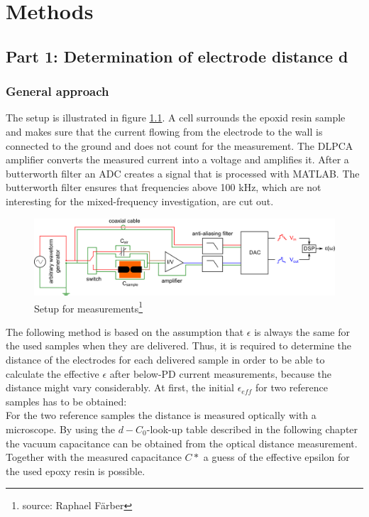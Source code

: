 \chapter{Methods}
\section{Part 1: Determination of electrode distance d}
\label{part1}
\subsection{General approach}
The setup is illustrated in figure \ref{sec.setup_amp_1}. A cell surrounds the  epoxid resin sample and makes sure that the current flowing from the electrode to the wall is connected to the ground and does not count for the measurement. The DLPCA amplifier converts the measured current into a voltage and amplifies it. After a butterworth filter an ADC creates a signal that is processed with MATLAB. The butterworth filter ensures that frequencies above 100 kHz, which are not interesting for the mixed-frequency investigation, are cut out. 

\begin{figure}[htbp]
	\centering
	\includegraphics[width=\textwidth]{figures/Method/setup/setup_amplifier.png}		
	\caption[Kurze Abbildungsbeschreibung]{Setup for measurements\footnote{source: Raphael F\"arber}} 
	\label{sec.setup_amp_1}

\end{figure}
\label{sec:general_approach}
The following method is based on the assumption that  $\epsilon$ is always the same for the used samples when they are delivered. Thus, it is required to determine the distance of the electrodes for each delivered sample in order to be able to calculate the effective $\epsilon$ after below-PD current measurements, because the distance might vary considerably. 
At first, the initial $\epsilon_{eff}$ for two reference samples has to be obtained:\\
For the two reference samples the distance is measured optically with a microscope. By using the $d-C_0$-look-up table described in the following chapter the vacuum capacitance can be obtained from the optical distance measurement. Together with the measured capacitance $C*$ a guess of the effective epsilon for the used epoxy resin is possible. 

